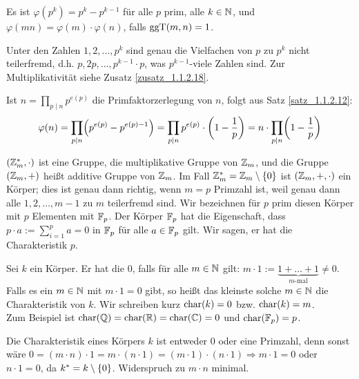 \begin{satz}
\label{satz_1.1.2.12}
	Es ist $\varphi(p^k) = p^k - p^{k-1}$ für alle $p$ prim, alle $k \in \mathbb{N}$, und $\varphi(mn) = \varphi(m) \cdot \varphi(n)$, falls $\operatorname{ggT}(m,n) = 1$.
\end{satz}

	Unter den Zahlen $1,2, \dots, p^k$ sind genau die Vielfachen von $p$ zu $p^k$ nicht teilerfremd, d.h. $p, 2p, \dots, p^{k-1} \cdot p$, was $p^{k-1}$-viele Zahlen sind. 
	Zur Multiplikativität siehe Zusatz \ref{zusatz_1.1.2.18}.
	
Ist $n = \prod_{p \mid n} p^{e(p)}$ die Primfaktorzerlegung von $n$, folgt aus Satz \ref{satz_1.1.2.12}:
\[ \varphi(n) = \prod_{p \mid n} \enb{p^{e(p)} - p^{e(p)-1}} = \prod_{p \mid n} p^{e(p)} \cdot \enb{1-\frac{1}{p}} = n \cdot \prod_{p \mid n} \enb{1-\frac{1}{p}} \]

\begin{folg}
	$(\mathbb{Z}_m^*,\cdot)$ ist eine Gruppe, die multiplikative Gruppe von $\mathbb{Z}_m$, und die Gruppe $(\mathbb{Z}_m,+)$ heißt additive Gruppe von $\mathbb{Z}_m$. 
	Im Fall $\mathbb{Z}_m^* = \mathbb{Z}_m \setminus \{0\}$ ist $(\mathbb{Z}_m,+,\cdot)$ ein Körper; dies ist genau dann richtig, wenn $m = p$ Primzahl ist, weil genau dann alle $1,2, \dots, m-1$ zu $m$ teilerfremd sind. 
	Wir bezeichnen für $p$ prim diesen Körper mit $p$ Elementen mit $\mathbb{F}_p$. 
	 Der Körper $\mathbb{F}_p$ hat die Eigenschaft, dass $p \cdot a := \sum_{i=1}^{p} a = 0$ in $\mathbb{F}_p$ für alle $a \in \mathbb{F}_p$ gilt. 
	Wir sagen, er hat die Charakteristik $p$.
\end{folg}

\begin{defn}[Charakteristik]
	Sei $k$ ein Körper. 
	Er hat die  $0$, falls für alle $m \in \mathbb{N}$ gilt: $m \cdot 1 := \underbrace{1 + \dots + 1}_{m\text{-mal}} \neq 0$. \\
	Falls es ein $m \in \mathbb{N}$ mit $m \cdot 1 = 0$ gibt, so heißt das kleinste solche $m \in \mathbb{N}$ die Charakteristik von $k$. 
	Wir schreiben kurz $\operatorname{char}(k) = 0$ bzw. $\operatorname{char}(k) = m$. \\
	Zum Beispiel ist $\operatorname{char}(\mathbb{Q}) = \operatorname{char}(\mathbb{R}) = \operatorname{char}(\mathbb{C}) = 0$ und $\operatorname{char}(\mathbb{F}_p) = p$.
\end{defn}

	Die Charakteristik eines Körpers $k$ ist entweder $0$ oder eine Primzahl, denn sonst wäre $0 = (m\cdot n) \cdot 1 = m \cdot (n \cdot 1) = (m \cdot 1) \cdot (n \cdot 1) \Rightarrow m \cdot 1 = 0$ oder $n \cdot 1 = 0$, da $k^* = k \setminus \{0\}$. 
	Widerspruch zu $m\cdot n$ minimal.

